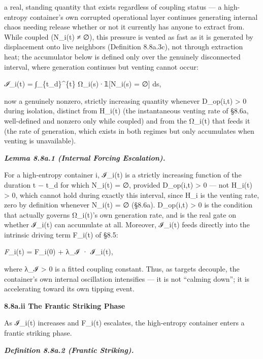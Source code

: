 \documentclass[
]{article}
\begin{document}
a real, standing quantity that exists regardless of coupling status ---
a high-entropy container's own corrupted operational layer continues
generating internal chaos needing release whether or not it currently
has anyone to extract from. While coupled (N\_i(t) ≠ ∅), this pressure
is vented as fast as it is generated by displacement onto live neighbors
(Definition 8.8a.3c), not through extraction heat; the accumulator below
is defined only over the genuinely disconnected interval, where
generation continues but venting cannot occur:

\emph{ℐ}\_i(t) = ∫\_\{t\_d\}\^{}\{t\} Ω\_i(s)·𝟙{[}N\_i(s) = ∅{]} ds,

now a genuinely nonzero, strictly increasing quantity whenever
D\_op(i,t) \textgreater{} 0 during isolation, distinct from H\_i(t) (the
instantaneous venting rate of §8.6a, well-defined and nonzero only while
coupled) and from the Ω\_i(t) that feeds it (the rate of generation,
which exists in both regimes but only accumulates when venting is
unavailable).

\emph{\textbf{Lemma 8.8a.1 (Internal Forcing Escalation).}}

For a high-entropy container i, ℐ\_i(t) is a strictly increasing
function of the duration t − t\_d for which N\_i(t) = ∅, provided
D\_op(i,t) \textgreater{} 0 --- not H\_i(t) \textgreater{} 0, which
cannot hold during exactly this interval, since H\_i is the venting
rate, zero by definition whenever N\_i(t) = ∅ (§8.6a). D\_op(i,t)
\textgreater{} 0 is the condition that actually governs Ω\_i(t)'s own
generation rate, and is the real gate on whether ℐ\_i(t) can accumulate
at all. Moreover, ℐ\_i(t) feeds directly into the intrinsic driving term
F\_i(t) of §8.5:

\emph{F}\_i(t) = F\_i(0) + λ\_ℐ · ℐ\_i(t),

where λ\_ℐ \textgreater{} 0 is a fitted coupling constant. Thus, as
targets decouple, the container's own internal oscillation intensifies
--- it is not ``calming down''; it is accelerating toward its own
tipping event.

\textbf{8.8a.ii The Frantic Striking Phase}

As ℐ\_i(t) increases and F\_i(t) escalates, the high-entropy container
enters a frantic striking phase.

\emph{\textbf{Definition 8.8a.2 (Frantic Striking).}}
\end{document}
